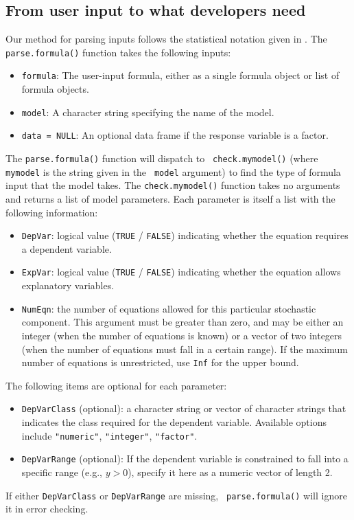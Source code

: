 \documentclass[oneside,letterpaper,12pt]{article}
\begin{document}
\subsection{From user input to what developers need}  

Our method for parsing inputs follows the statistical notation given
in \cite{King89}.  The {\tt parse.formula()} function takes the
following inputs:
\begin{itemize}

\item {\tt formula}: The user-input formula, either as a single
formula object or list of formula objects.  

\item {\tt model}: A character string specifying the name of the
model.  

\item {\tt data = NULL}: An optional data frame if the response
variable is a factor.  

\end{itemize}

The {\tt parse.formula()} function will dispatch to {\tt
check.mymodel()} (where {\tt mymodel} is the string given in the {\tt
model} argument) to find the type of formula input that the model
takes.  The {\tt check.mymodel()} function takes no arguments and
returns a list of model parameters.  Each parameter is itself a list with
the following information:  
\begin{itemize}
\item {\tt DepVar}:  logical value ({\tt TRUE} / {\tt FALSE})
indicating whether the equation requires a dependent variable.  
\item {\tt ExpVar}:  logical value ({\tt TRUE} / {\tt FALSE})
indicating whether the equation allows explanatory variables.  
\item {\tt NumEqn}: the number of equations allowed for this
particular stochastic component.  This argument must be greater than
zero, and may be either an integer (when the number of equations is
known) or a vector of two integers (when the number of equations must
fall in a certain range).  If the maximum number of equations is
unrestricted, use {\tt Inf} for the upper bound.  
\end{itemize}  
The following items are optional for each parameter: 
\begin{itemize}
\item {\tt DepVarClass} (optional): a character string or vector of
character strings that indicates the class required for the dependent
variable.  Available options include {\tt "numeric"}, {\tt "integer"},
{\tt "factor"}. 
\item {\tt DepVarRange} (optional): If the dependent variable is
constrained to fall into a specific range (e.g., $y > 0$), specify it
here as a numeric vector of length 2.  
\end{itemize}
If either {\tt DepVarClass} or {\tt DepVarRange} are missing, {\tt
parse.formula()} will ignore it in error checking.  
\end{document}
